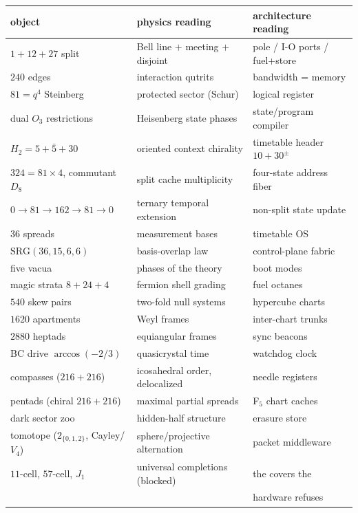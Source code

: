 \documentclass[11pt]{article}
\begin{document}
\begin{center}\small
\begin{tabular}{lll}
\toprule
object & physics reading & architecture reading\\
\midrule
$1+12+27$ split & Bell line $+$ meeting $+$ disjoint & pole / I-O ports / fuel+store\\
$240$ edges & interaction qutrits & bandwidth = memory\\
$81=q^4$ Steinberg & protected sector (Schur) & logical register\\
dual $O_3$ restrictions & Heisenberg state phases & state/program compiler\\
$H_2=5+\bar5+30$ & oriented context chirality & timetable header $10+30^\pm$\\
$324=81\times4$, commutant $D_8$ & split cache multiplicity & four-state address fiber\\
$0\to81\to162\to81\to0$ & ternary temporal extension & non-split state update\\
$36$ spreads & measurement bases & timetable OS\\
$\mathrm{SRG}(36,15,6,6)$ & basis-overlap law & control-plane fabric\\
five vacua & phases of the theory & boot modes\\
magic strata $8{+}24{+}4$ & fermion shell grading & fuel octanes\\
$540$ skew pairs & two-fold null systems & hypercube charts\\
$1620$ apartments & Weyl frames & inter-chart trunks\\
$2880$ heptads & equiangular frames & sync beacons\\
BC drive $\arccos(-2/3)$ & quasicrystal time & watchdog clock\\
compasses ($216{+}216$) & icosahedral order, delocalized & needle registers\\
pentads (chiral $216{+}216$) & maximal partial spreads & F$_5$ chart caches\\
dark sector zoo & hidden-half structure & erasure store\\
tomotope ($2_{\{0,1,2\}}$, Cayley/$V_4$) & sphere/projective alternation & packet middleware\\
$11$-cell, $57$-cell, $J_1$ & universal completions (blocked) & the covers the\\
 & & hardware refuses\\
\bottomrule
\end{tabular}
\end{center}
\end{document}
